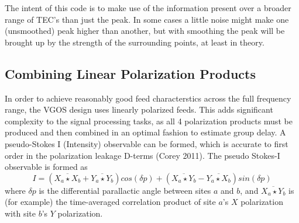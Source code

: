 The intent of this code is to make use of the information
present over a broader range of TEC's than just the
peak. In some cases a little noise might make one
(unsmoothed) peak higher than another, but with
smoothing the peak will be brought up by the strength
of the surrounding points, at least in theory.


\subsection{Combining Linear Polarization Products}

In order to achieve reasonably good feed characterstics across the
full frequency range, the VGOS design uses linearly polarized feeds.
This adds significant complexity to the signal processing tasks, as
all 4 polarization products must be produced and then combined in an
optimal fashion to estimate group delay. A pseudo-Stokes I (Intensity)
observable can be formed, which is accurate to first order in the 
polarization leakage D-terms (Corey 2011).  The pseudo Stokes-I 
observable is formed as
\begin{equation} \label{eq:stokesI}
        I = (\overline{X_a \star X_b} + \overline{Y_a \star Y_b}) cos (\delta p) 
          + (\overline{X_a \star Y_b} - \overline{Y_a \star X_b}) sin (\delta p)
\end{equation}
where $\delta p$ is the differential
parallactic angle between sites $a$ and $b$, and $\overline{X_a \star Y_b}$ 
is (for example) the 
time-averaged correlation product of site $a$'s $X$ polarization with 
site $b$'s $Y$ polarization.
%


